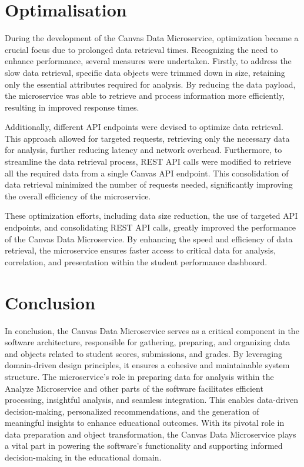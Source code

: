\documentclass[a4paper, 11pt]{article}
\begin{document}
\section{Optimalisation}
During the development of the Canvas Data Microservice, optimization became a crucial focus due to prolonged data retrieval times. Recognizing the need to enhance performance, several measures were undertaken. Firstly, to address the slow data retrieval, specific data objects were trimmed down in size, retaining only the essential attributes required for analysis. By reducing the data payload, the microservice was able to retrieve and process information more efficiently, resulting in improved response times. 

Additionally, different API endpoints were devised to optimize data retrieval. This approach allowed for targeted requests, retrieving only the necessary data for analysis, further reducing latency and network overhead. Furthermore, to streamline the data retrieval process, REST API calls were modified to retrieve all the required data from a single Canvas API endpoint. This consolidation of data retrieval minimized the number of requests needed, significantly improving the overall efficiency of the microservice.

These optimization efforts, including data size reduction, the use of targeted API endpoints, and consolidating REST API calls, greatly improved the performance of the Canvas Data Microservice. By enhancing the speed and efficiency of data retrieval, the microservice ensures faster access to critical data for analysis, correlation, and presentation within the student performance dashboard.


\section{Conclusion}
In conclusion, the Canvas Data Microservice serves as a critical component in the software architecture, responsible for gathering, preparing, and organizing data and objects related to student scores, submissions, and grades. By leveraging domain-driven design principles, it ensures a cohesive and maintainable system structure. The microservice's role in preparing data for analysis within the Analyze Microservice and other parts of the software facilitates efficient processing, insightful analysis, and seamless integration. This enables data-driven decision-making, personalized recommendations, and the generation of meaningful insights to enhance educational outcomes. With its pivotal role in data preparation and object transformation, the Canvas Data Microservice plays a vital part in powering the software's functionality and supporting informed decision-making in the educational domain.




\pagebreak
\end{document}
